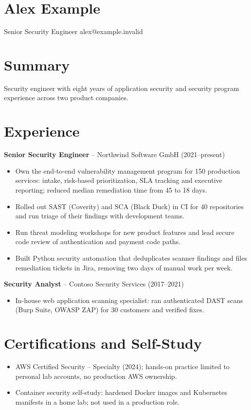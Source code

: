 \documentclass{article}
\begin{document}
\section*{Alex Example}
Senior Security Engineer \textbullet{} alex@example.invalid

\section*{Summary}
Security engineer with eight years of application security and security
program experience across two product companies.

\section*{Experience}

\textbf{Senior Security Engineer} -- Northwind Software GmbH (2021--present)
\begin{itemize}
  \item Own the end-to-end vulnerability management program for 150 production
        services: intake, risk-based prioritization, SLA tracking and executive
        reporting; reduced median remediation time from 45 to 18 days.
  \item Rolled out SAST (Coverity) and SCA (Black Duck) in CI for 40 repositories
        and run triage of their findings with development teams.
  \item Run threat modeling workshops for new product features and lead secure
        code review of authentication and payment code paths.
  \item Built Python security automation that deduplicates scanner findings and
        files remediation tickets in Jira, removing two days of manual work per week.
\end{itemize}

\textbf{Security Analyst} -- Contoso Security Services (2017--2021)
\begin{itemize}
  \item In-house web application scanning specialist: ran authenticated DAST
        scans (Burp Suite, OWASP ZAP) for 30 customers and verified fixes.
\end{itemize}

\section*{Certifications and Self-Study}
\begin{itemize}
  \item AWS Certified Security -- Specialty (2024); hands-on practice limited to
        personal lab accounts, no production AWS ownership.
  \item Container security self-study: hardened Docker images and Kubernetes
        manifests in a home lab; not used in a production role.
\end{itemize}
\end{document}
